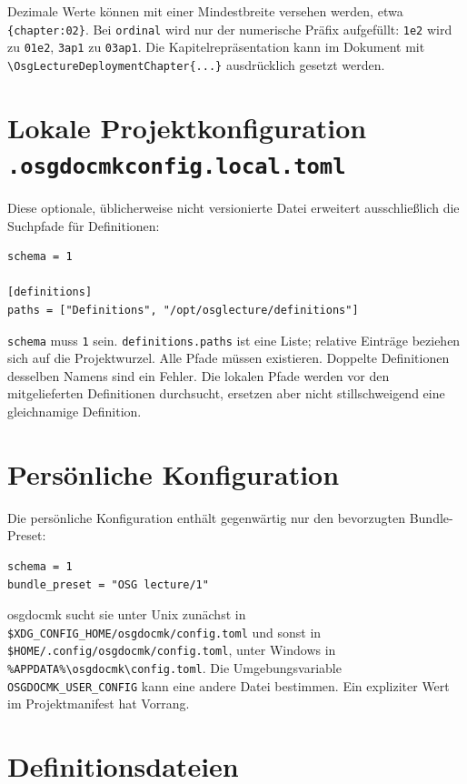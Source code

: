 \documentclass[
load-preamble+
]{osgdoc}
\begin{document}
Dezimale Werte können mit einer Mindestbreite versehen werden, etwa
\texttt{\{chapter:02\}}. Bei \texttt{ordinal} wird nur der numerische Präfix
aufgefüllt: \texttt{1e2} wird zu \texttt{01e2}, \texttt{3ap1} zu
\texttt{03ap1}. Die Kapitelrepräsentation kann im Dokument mit
\verb|\OsgLectureDeploymentChapter{...}| ausdrücklich gesetzt werden.

\section{Lokale Projektkonfiguration \texttt{.osgdocmkconfig.local.toml}}

Diese optionale, üblicherweise nicht versionierte Datei erweitert ausschließlich
die Suchpfade für Definitionen:

\begin{verbatim}
schema = 1

[definitions]
paths = ["Definitions", "/opt/osglecture/definitions"]
\end{verbatim}

\verb|schema| muss \texttt{1} sein. \verb|definitions.paths| ist eine Liste;
relative Einträge beziehen sich auf die Projektwurzel. Alle Pfade müssen
existieren. Doppelte Definitionen desselben Namens sind ein Fehler. Die lokalen
Pfade werden vor den mitgelieferten Definitionen durchsucht, ersetzen aber
nicht stillschweigend eine gleichnamige Definition.

\section{Persönliche Konfiguration}

Die persönliche Konfiguration enthält gegenwärtig nur den bevorzugten
Bundle-Preset:

\begin{verbatim}
schema = 1
bundle_preset = "OSG lecture/1"
\end{verbatim}

osgdocmk sucht sie unter Unix zunächst in \verb|$XDG_CONFIG_HOME/osgdocmk/config.toml|
und sonst in \verb|$HOME/.config/osgdocmk/config.toml|, unter Windows in
\verb|%APPDATA%\osgdocmk\config.toml|. Die Umgebungsvariable
\verb|OSGDOCMK_USER_CONFIG| kann eine andere Datei bestimmen. Ein expliziter Wert
im Projektmanifest hat Vorrang.

\section{Definitionsdateien}
\end{document}

